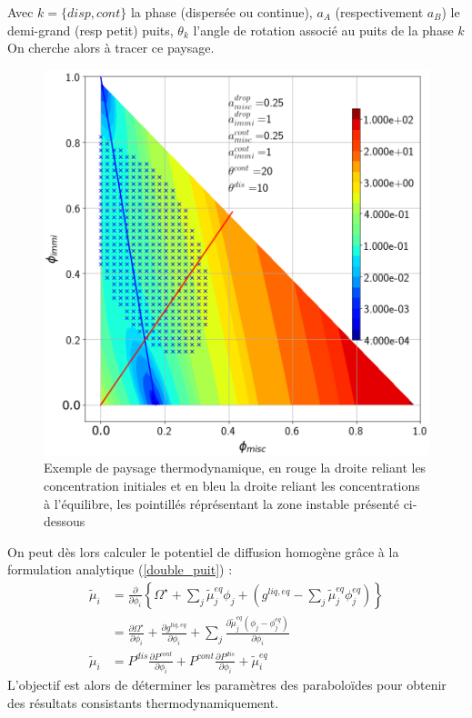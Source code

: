 Avec $k = \{disp,cont\}$ la phase (dispersée ou continue), $a_A$ (respectivement $a_B$) le demi-grand (resp petit) puits, $\theta_k$ l'angle de rotation associé au puits de la phase $k$\\
On cherche alors à tracer ce paysage.
\begin{figure}[h!]
	\centering
	\includegraphics[width=0.7\linewidth]{figure/landscape}
	\caption{Exemple de paysage thermodynamique, en rouge la droite reliant les concentration initiales et en bleu la droite reliant les concentrations à l'équilibre, les pointillés réprésentant la zone instable présenté ci-dessous}
	\label{fig:landscape}
\end{figure}
On peut dès lors calculer le potentiel de diffusion homogène grâce à la formulation analytique (\ref{double_puit}) :
\begin{align}
	\tilde{\mu}_i & \nonumber= \frac{\partial}{\partial \phi_i}\left\lbrace 
	\Omega^{\star} + \sum_j \tilde{\mu}_j^{eq}\phi_j + \left( {g}^{liq,eq} -  \sum_j \tilde{\mu}_j^{eq}\phi_j^{eq} \right)\right\rbrace \\
	&\nonumber = \frac{\partial \Omega^{\star}}{\partial \phi_i} + \frac{\partial g^{liq,eq}}{\partial \phi_i} + \sum_j \frac{\partial \tilde{\mu}_j^{eq}\left(\phi_j - \phi_j^{eq}\right)}{\partial  \phi_i}\\
	\tilde{\mu}_i &=	P^{dis}\frac{\partial P^{cont}}{\partial \phi_i} + P^{cont}\frac{\partial P^{dis}}{\partial \phi_i} + \tilde{\mu}_i^{eq}
\end{align} 
L'objectif est alors de déterminer les paramètres des paraboloïdes pour obtenir des résultats consistants thermodynamiquement.
